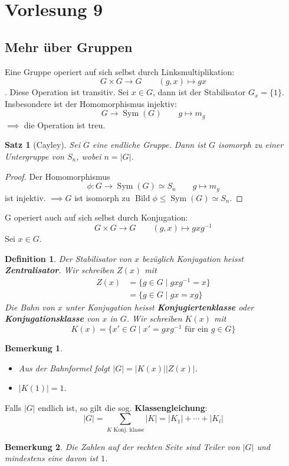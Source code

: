 \documentclass{article}
\theoremstyle{plain}
\newtheorem{definition}{Definition}
\newtheorem{theorem}{Satz}
\newtheorem{bemerkung}{Bemerkung}
\newcommand{\bild}{\mathop{\mathrm{Bild}}}
\newcommand{\defn}[1]{\textbf{#1}}
\newcommand{\ug}{\leq}
\newcommand{\sym}{\mathop{\text{Sym}}}
\newcommand{\iso}{\simeq}
\begin{document}
\section*{Vorlesung 9}

\subsection*{Mehr über Gruppen}
Eine Gruppe operiert auf sich selbst durch Linksmultiplikation:
$$G\times G \to G \qquad (g,x) \mapsto gx$$.
Diese Operation ist transitiv.
Sei $x\in G$, dann ist der Stabilisator $G_x=\{1\}$.
Insbesondere ist der Homomorphismus injektiv: 
$$G\to\sym(G)\qquad g\mapsto m_g$$
$\implies$ die Operation ist treu.

\begin{theorem}[Cayley]
    Sei $G$ eine endliche Gruppe. Dann ist $G$ isomorph zu einer Untergruppe von $S_n$, wobei $n=|G|$.
\end{theorem}
\begin{proof}
    Der Homomorphismus $$\phi\colon G\to\sym(G) \iso S_n \qquad g\mapsto m_g$$ ist injektiv.
    $\implies G$ ist isomorph zu $\bild\phi\ug\sym(G)\iso S_n$.
\end{proof}
G operiert auch auf sich selbst durch Konjugation:
$$G\times G \to G \qquad (g,x)\mapsto gxg^{-1}$$
Sei $x\in G$.
\begin{definition}
    Der Stabilisator von $x$ bezüglich Konjugation heisst \defn{Zentralisator}.
    Wir schreiben $Z(x)$ mit
    \begin{align*}
    Z(x) &= \{g\in G\mid gxg^{-1}=x\}\\
    &= \{g\in G\mid gx=xg\}
    \end{align*}
    Die Bahn von $x$ unter Konjugation heisst \defn{Konjugiertenklasse} oder \defn{Konjugationsklasse} von $x$ in $G$.
    Wir schreiben $K(x)$ mit
    $$K(x)=\{x'\in G\mid x'=gxg^{-1} \text{ für ein } g\in G\}$$
\end{definition}
\begin{bemerkung}
    \quad
    \begin{itemize}
        \item Aus der Bahnformel folgt $|G| = |K(x)||Z(x)|$.
        \item $|K(1)| = 1$.
    \end{itemize}
\end{bemerkung}
Falls $|G|$ endlich ist, so gilt die sog. \defn{Klassengleichung}:
$$|G|=\sum\limits_{K \text{ Konj. klasse}}|K| = |K_1|+\cdots+|K_l|$$ 
\begin{bemerkung}
    Die Zahlen auf der rechten Seite sind Teiler von $|G|$ und mindestens eine davon ist $1$.
\end{bemerkung}
\end{document}
